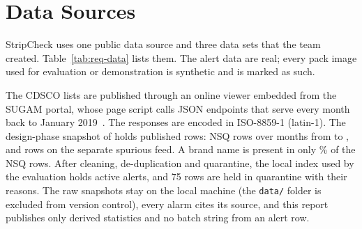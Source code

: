 \section{Data Sources}
\label{sec:req-data-sources}

StripCheck uses one public data source and three data sets that the team created.
Table~\ref{tab:req-data} lists them. The alert data are real; every pack image used for
evaluation or demonstration is synthetic and is marked as such.

The CDSCO lists are published through an online viewer embedded from the SUGAM portal, whose page
script calls JSON endpoints that serve every month back to January 2019~\cite{cdsco2026portal,cdsco2026nsqpage}.
The responses are encoded in ISO-8859-1 (latin-1). The design-phase snapshot of \SnapshotDate{}
holds \NumAlertRows{} published rows: \NumNsqRows{} NSQ rows over \NumMonths{} months from
\FirstMonth{} to \LastMonth{}, and \NumSpuriousTabRows{} rows on the separate spurious feed. A
brand name is present in only \BrandPresentPct\% of the NSQ rows. After cleaning, de-duplication
and quarantine, the local index used by the evaluation holds \ResAlertCount{} active alerts, and
75 rows are held in quarantine with their reasons. The raw snapshots stay on the local machine
(the \texttt{data/} folder is excluded from version control), every alarm cites its source, and
this report publishes only derived statistics and no batch string from an alert row.

